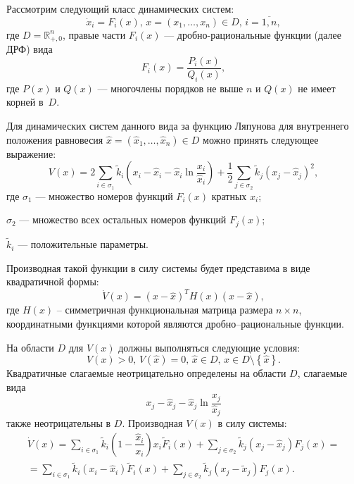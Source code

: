 \documentclass[14pt,a4paper]{extarticle}
\begin{document}
	
	Рассмотрим следующий класс динамических систем:
	\[\dot{x}_i=F_i(x),\, x=(x_1,\ldots,x_n)\in D,\, i=\overline{1,n},\]
	где $D = \mathbb{R}^{n}_{+,0}$, правые части $F_i(x)$ --- дробно-рациональные функции (далее ДРФ) вида 
	\begin{equation*}
		F_i(x)=\dfrac{P_i(x)}{Q_i(x)},
	\end{equation*}
	где $P(x)$ и $Q(x)$ --- многочлены порядков не выше $n$ и $Q(x)$ не имеет корней в~$D$. 
	
	Для динамических систем данного  вида за функцию Ляпунова для внутреннего положения равновесия $\hat{x}=(\hat{x}_1,\ldots,\hat{x}_n)\in D$ можно принять следующее выражение:
	\[V(x)=2\sum\limits_{i\in\sigma_1}\tilde{k}_i\left(x_i-\hat{x}_i-\hat{x}_i\ln\dfrac{x_i}{\hat{x}_i}\right)+\dfrac{1}{2}\sum\limits_{j\in\sigma_2}\tilde{k}_j\left(x_j-\hat{x}_j\right)^2,\]
	где $\sigma_1$ --- множество номеров функций $F_i(x)$ кратных $x_i$;
	
	$\sigma_2$ --- множество всех остальных номеров функций $F_j(x)$;
	
	$\tilde{k}_i$ --- положительные параметры. 
	
	Производная такой функции в силу системы будет представима в виде квадратичной формы:
	\[\dot{V}(x)=(x-\hat{x})^{T}H(x)(x-\hat{x}),\]
	где $H(x)$ -- симметричная функциональная матрица размера $n\times n$, координатными функциями которой являются дробно--рациональные функции. 
	
	На области $D$ для $V(x)$ должны выполняться следующие условия:
	\[V(x)>0,\, V(\hat{x})=0,\, \hat{x}\in D,\,x\in D\setminus\left\{\hat{x}\right\}.\]
	Квадратичные слагаемые неотрицательно определены на области $D$, слагаемые вида
	\[x_j-\hat{x}_j-\hat{x}_j\ln\dfrac{x_j}{\hat{x}_j}\] 
	также неотрицательны в $D$.
	Производная $V(x)$ в силу системы:
	\begin{multline*}
		\dot{V}(x)=\sum\limits_{i\in\sigma_1}\tilde{k}_i\left(1-\dfrac{\hat{x}_i}{x_i}\right)x_i\tilde{F}_i(x)+\sum\limits_{j\in\sigma_2}\tilde{k}_j(x_j-\hat{x}_j)F_j(x)=\\
		=\sum\limits_{i\in\sigma_1}\tilde{k}_i(x_i-\hat{x}_i)\tilde{F}_i(x)+\sum\limits_{j\in\sigma_2}\tilde{k}_j(x_j-\tilde{x}_j)F_j(x).
	\end{multline*}
	
\end{document}

